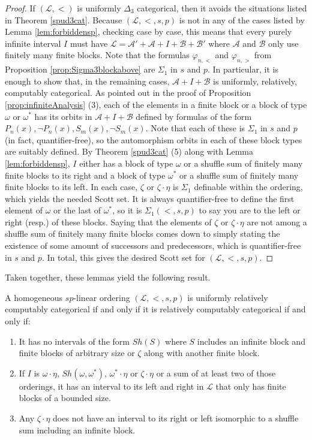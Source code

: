 \documentclass[11pt]{amsart}
\theoremstyle{definition}
\def\A{\mathcal A}
\def\B{\mathcal{B}}
\def\L{\mathcal L}
\begin{document}
\begin{proof}
    If $(\L,<)$ is uniformly $\Delta_3$ categorical, then it avoids the situations listed in Theorem \ref{spud3cat}.
    Because $(\L,<,s,p)$ is not in any of the cases listed by Lemma \ref{lem:forbiddensp}, checking case by case, this means that every purely infinite interval $I$ must have $\L=\A'+\A+I+\B+\B'$ where $\A$ and $\B$ only use finitely many finite blocks. 
    Note that the formulas $\varphi_{n,<}$ and $\varphi_{n,>}$ from Proposition \ref{prop:Sigma3blockabove} are $\Sigma_1$ in $s$ and $p$.
    In particular, it is enough to show that, in the remaining cases, $\A+I+\B$ is uniformly, relatively, computably categorical. 
    As pointed out in the proof of Proposition \ref{prop:infiniteAnalysis} (3), each of the elements in a finite block or a block of type $\omega$ or $\omega^*$ has its orbits in $\A+I+\B$ defined by formulas of the form $P_n(x), \lnot P_n(x), S_m(x),\lnot S_m(x)$.
    Note that each of these is $\Sigma_1$ in $s$ and $p$ (in fact, quantifier-free), so the automorphism orbits in each of these block types are suitably defined.
    By Theorem \ref{spud3cat} (5) along with Lemma \ref{lem:forbiddensp}, $I$ either has a block of type $\omega$ or a shuffle sum of finitely many finite blocks to its right and a block of type $\omega^*$ or a shuffle sum of finitely many finite blocks to its left.
    In each case, $\zeta$ or $\zeta\cdot\eta$ is $\Sigma_1$ definable within the ordering, which yields the needed Scott set.
    It is always quantifier-free to define the first element of $\omega$ or the last of $\omega^*$, so it is $\Sigma_1(<,s,p)$ to say you are to the left or right (resp.) of these blocks.
    Saying that the elements of $\zeta$ or $\zeta\cdot\eta$ are not among a shuffle sum of finitely many finite blocks comes down to simply stating the existence of some amount of successors and predecessors, which is quantifier-free in $s$ and $p$.
    In total, this gives the desired Scott set for $(\L,<,s,p)$.
\end{proof}

Taken together, these lemmas yield the following result.


 \begin{theorem}
        A homogeneous $sp$-linear ordering $(\L,<,s,p)$ is uniformly relatively computably categorical if and only if it is relatively computably categorical if and only if: 
        \begin{enumerate}
            \item It has no intervals of the form $Sh(S)$ where $S$ includes an infinite block and finite blocks of arbitrary size or $\zeta$ along with another finite block.
            \item If $I$ is $\omega\cdot\eta$, $Sh(\omega,\omega^*)$, $\omega^*\cdot\eta$ or $\zeta\cdot\eta$ or a sum of at least two of those orderings, it has an interval to its left and right in $\L$ that only has finite blocks of a bounded size.
            \item Any $\zeta\cdot\eta$ does not have an interval to its right or left isomorphic to a shuffle sum including an infinite block.
        \end{enumerate}
    \end{theorem} 
   
\end{document}
